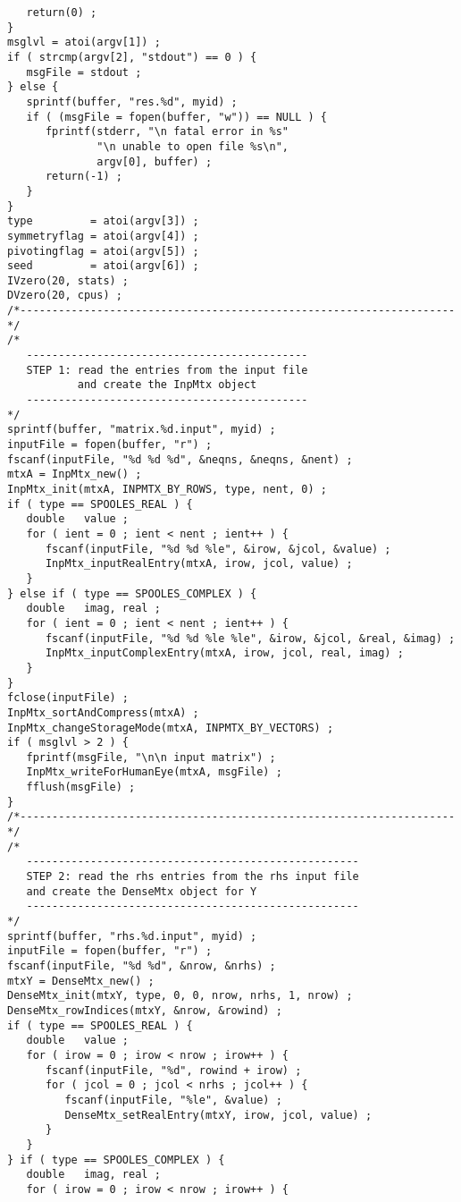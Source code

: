 \begin{verbatim}
   return(0) ;
}
msglvl = atoi(argv[1]) ;
if ( strcmp(argv[2], "stdout") == 0 ) {
   msgFile = stdout ;
} else {
   sprintf(buffer, "res.%d", myid) ;
   if ( (msgFile = fopen(buffer, "w")) == NULL ) {
      fprintf(stderr, "\n fatal error in %s"
              "\n unable to open file %s\n",
              argv[0], buffer) ;
      return(-1) ;
   }
}
type         = atoi(argv[3]) ;
symmetryflag = atoi(argv[4]) ;
pivotingflag = atoi(argv[5]) ;
seed         = atoi(argv[6]) ;
IVzero(20, stats) ;
DVzero(20, cpus) ;
/*--------------------------------------------------------------------*/
/*
   --------------------------------------------
   STEP 1: read the entries from the input file 
           and create the InpMtx object
   --------------------------------------------
*/
sprintf(buffer, "matrix.%d.input", myid) ;
inputFile = fopen(buffer, "r") ;
fscanf(inputFile, "%d %d %d", &neqns, &neqns, &nent) ;
mtxA = InpMtx_new() ;
InpMtx_init(mtxA, INPMTX_BY_ROWS, type, nent, 0) ;
if ( type == SPOOLES_REAL ) {
   double   value ;
   for ( ient = 0 ; ient < nent ; ient++ ) {
      fscanf(inputFile, "%d %d %le", &irow, &jcol, &value) ;
      InpMtx_inputRealEntry(mtxA, irow, jcol, value) ;
   }
} else if ( type == SPOOLES_COMPLEX ) {
   double   imag, real ;
   for ( ient = 0 ; ient < nent ; ient++ ) {
      fscanf(inputFile, "%d %d %le %le", &irow, &jcol, &real, &imag) ;
      InpMtx_inputComplexEntry(mtxA, irow, jcol, real, imag) ;
   }
}
fclose(inputFile) ;
InpMtx_sortAndCompress(mtxA) ;
InpMtx_changeStorageMode(mtxA, INPMTX_BY_VECTORS) ;
if ( msglvl > 2 ) {
   fprintf(msgFile, "\n\n input matrix") ;
   InpMtx_writeForHumanEye(mtxA, msgFile) ;
   fflush(msgFile) ;
}
/*--------------------------------------------------------------------*/
/*
   ----------------------------------------------------
   STEP 2: read the rhs entries from the rhs input file 
   and create the DenseMtx object for Y
   ----------------------------------------------------
*/
sprintf(buffer, "rhs.%d.input", myid) ;
inputFile = fopen(buffer, "r") ;
fscanf(inputFile, "%d %d", &nrow, &nrhs) ;
mtxY = DenseMtx_new() ;
DenseMtx_init(mtxY, type, 0, 0, nrow, nrhs, 1, nrow) ;
DenseMtx_rowIndices(mtxY, &nrow, &rowind) ;
if ( type == SPOOLES_REAL ) {
   double   value ;
   for ( irow = 0 ; irow < nrow ; irow++ ) {
      fscanf(inputFile, "%d", rowind + irow) ;
      for ( jcol = 0 ; jcol < nrhs ; jcol++ ) {
         fscanf(inputFile, "%le", &value) ;
         DenseMtx_setRealEntry(mtxY, irow, jcol, value) ;
      }
   }
} if ( type == SPOOLES_COMPLEX ) {
   double   imag, real ;
   for ( irow = 0 ; irow < nrow ; irow++ ) {

\end{verbatim}
